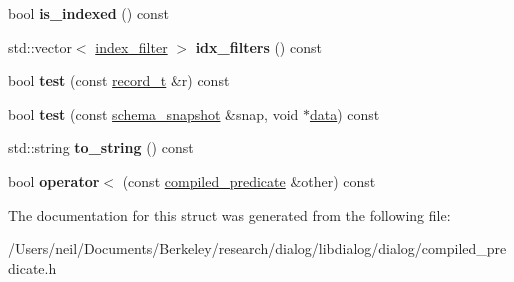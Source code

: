 \begin{DoxyCompactItemize}
bool {\bfseries is\+\_\+indexed} () const
\item 
\mbox{\label{structdialog_1_1compiled__predicate_a9cae9afd849af64a32f426c0666e546c}} 
std\+::vector$<$ \hyperlink{classdialog_1_1index__filter}{index\+\_\+filter} $>$ {\bfseries idx\+\_\+filters} () const
\item 
\mbox{\label{structdialog_1_1compiled__predicate_a39bd0649c3a0f106a23f4ffed196df61}} 
bool {\bfseries test} (const \hyperlink{structdialog_1_1record__t}{record\+\_\+t} \&r) const
\item 
\mbox{\label{structdialog_1_1compiled__predicate_ab31a2a631a339b9577d1d857d3e2efd4}} 
bool {\bfseries test} (const \hyperlink{classdialog_1_1schema__snapshot}{schema\+\_\+snapshot} \&snap, void $\ast$\hyperlink{structdialog_1_1data}{data}) const
\item 
\mbox{\label{structdialog_1_1compiled__predicate_aa5604b12d413a960d291b7366dcf8657}} 
std\+::string {\bfseries to\+\_\+string} () const
\item 
\mbox{\label{structdialog_1_1compiled__predicate_a3098d821886e26e2bb95082b544cfede}} 
bool {\bfseries operator$<$} (const \hyperlink{structdialog_1_1compiled__predicate}{compiled\+\_\+predicate} \&other) const
\end{DoxyCompactItemize}


The documentation for this struct was generated from the following file\+:\begin{DoxyCompactItemize}
\item 
/\+Users/neil/\+Documents/\+Berkeley/research/dialog/libdialog/dialog/compiled\+\_\+predicate.\+h\end{DoxyCompactItemize}
